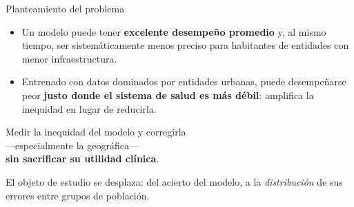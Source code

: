 \documentclass[aspectratio=169,11pt]{beamer}
\newcommand{\resalta}[1]{{\color{vino}\bfseries #1}}
\begin{document}
\begin{frame}{Planteamiento del problema}
  \vspace{0.4em}
  \begin{itemize}
    \item Un modelo puede tener \resalta{excelente desempeño promedio} y, al
          mismo tiempo, ser sistemáticamente menos preciso para habitantes de
          entidades con menor infraestructura.
    \item Entrenado con datos dominados por entidades urbanas, puede
          desempeñarse peor \resalta{justo donde el sistema de salud es más
          débil}: amplifica la inequidad en lugar de reducirla.
  \end{itemize}

  \vspace{0.9em}
  \begin{center}
  \begin{minipage}{0.90\textwidth}
    \begin{block}{}
      \centering\large
      Medir la inequidad del modelo y corregirla\\
      —especialmente la geográfica—\\
      \resalta{sin sacrificar su utilidad clínica}.
    \end{block}
  \end{minipage}
  \end{center}

  \vspace{0.7em}
  {\footnotesize\color{humo} El objeto de estudio se desplaza: del acierto del
  modelo, a la \textit{distribución} de sus errores entre grupos de
  población.}
\end{frame}
\end{document}
